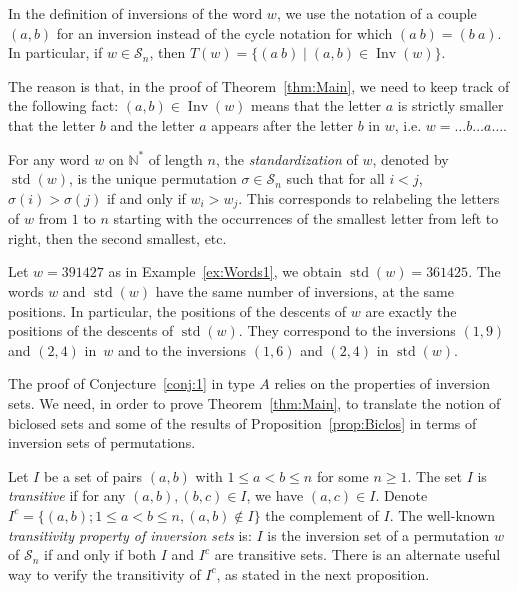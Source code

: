 \documentclass[ALCO,Unicode]{cedram}
\theoremstyle{definition}
\newcommand{\Sym}[1]{\mathcal{S}_{#1}}
\newcommand{\Symn}{\Sym{n}}
\newcommand{\NN}{\mathbb{N}}
\DeclareMathOperator{\std}{std}
\DeclareMathOperator{\invs}{Inv}
\begin{document}
\begin{remark} In the definition of inversions of the word $w$, we use the notation of a couple $(a,b)$ for an inversion instead of the cycle notation for which $(a\ b)=(b\ a)$.  In particular, if $w\in\Symn$, then $T(w)=\{(a\ b)\mid (a,b)\in\invs(w)\}$.

The reason is that, in the proof of Theorem~\ref{thm:Main}, we need to keep track of the following fact:  $(a,b)\in \invs(w)$ means that the letter $a$ is strictly smaller that the letter $b$ and the letter $a$ appears after the letter $b$ in $w$, i.e.  $w=\dots b\dots a\dots$.
\end{remark}


For any word $w$ on $\NN^*$ of length $n$, the \emph{standardization} of $w$, denoted by $\std(w)$, is the unique permutation $\sigma\in \Symn$ such that for all $i < j$, $\sigma(i) > \sigma(j)$ if and only if $w_i > w_j$.  This corresponds to relabeling the letters of $w$ from $1$ to $n$ starting with the occurrences of the smallest letter from left to right, then the second smallest, etc. 

\begin{ex} Let $w =391427$ as in Example~\ref{ex:Words1}, we obtain $\std(w) = 361425$. The words $w$ and $\std(w)$ have the same number of inversions, at the same positions. In particular, the positions of the descents of $w$ are exactly the positions of the descents of $\std(w)$. They correspond to the inversions $(1,9)$ and $(2,4)$ in~$w$ and to the inversions $(1,6)$ and $(2,4)$  in $\std(w)$.
\end{ex}

The proof of Conjecture~\ref{conj:1} in type $A$ relies on the properties of  inversion sets.  We need, in order to prove Theorem~\ref{thm:Main}, to translate the notion of biclosed sets  and some of the results of Proposition~\ref{prop:Biclos} in terms of inversion sets of permutations. 

Let $I$ be a set of pairs $(a,b)$ with $1 \leq a < b \leq n$ for some $n \geq 1$. The set $I$ is {\em transitive} if for any $(a,b),(b,c) \in I$, we have $(a,c) \in I$.  Denote $I^c = \lbrace (a,b); 1 \leq a < b \leq n, (a,b) \not\in I \rbrace$ the complement of $I$. The well-known {\em transitivity property of inversion sets} is:  $I$ is the inversion set of a permutation $w$ of $\Symn$ if and only if both $I$ and $I^c$  are transitive sets.  There is an alternate useful way to verify the transitivity of $I^c$, as stated in the next proposition. 
\end{document}
